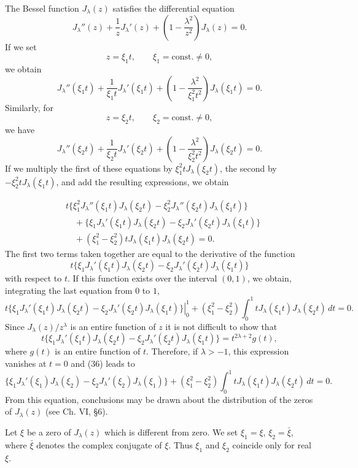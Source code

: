 The Bessel function $J_\lambda(z)$ satisfies the differential equation
\[
J_\lambda''(z)+\frac1zJ_\lambda'(z)+\left(1-\frac{\lambda^2}{z^2}\right)J_\lambda(z)=0.
\]
If we set
\[
z=\xi_1t,\qquad \xi_1=\text{const.}\ne0,
\]
we obtain
\[
J_\lambda''(\xi_1t)+\frac1{\xi_1t}J_\lambda'(\xi_1t)
+\left(1-\frac{\lambda^2}{\xi_1^2t^2}\right)J_\lambda(\xi_1t)=0.
\]
Similarly, for
\[
z=\xi_2t,\qquad \xi_2=\text{const.}\ne0,
\]
we have
\[
J_\lambda''(\xi_2t)+\frac1{\xi_2t}J_\lambda'(\xi_2t)
+\left(1-\frac{\lambda^2}{\xi_2^2t^2}\right)J_\lambda(\xi_2t)=0.
\]
If we multiply the first of these equations by $\xi_1^2tJ_\lambda(\xi_2t)$, the second by $-\xi_2^2tJ_\lambda(\xi_1t)$, and add the resulting expressions, we obtain

\[
\begin{aligned}
&t\{\xi_1^2J_\lambda''(\xi_1t)J_\lambda(\xi_2t)-\xi_2^2J_\lambda''(\xi_2t)J_\lambda(\xi_1t)\}\\
&\quad+\{\xi_1J_\lambda'(\xi_1t)J_\lambda(\xi_2t)-\xi_2J_\lambda'(\xi_2t)J_\lambda(\xi_1t)\}\\
&\quad+(\xi_1^2-\xi_2^2)tJ_\lambda(\xi_1t)J_\lambda(\xi_2t)=0.
\end{aligned}
\]
The first two terms taken together are equal to the derivative of the function
\[
t\{\xi_1J_\lambda'(\xi_1t)J_\lambda(\xi_2t)-\xi_2J_\lambda'(\xi_2t)J_\lambda(\xi_1t)\}
\]
with respect to $t$. If this function exists over the interval $(0,1)$, we obtain, integrating the last equation from $0$ to $1$,
\begin{equation}\tag{36}
\left.t\{\xi_1J_\lambda'(\xi_1t)J_\lambda(\xi_2t)-\xi_2J_\lambda'(\xi_2t)J_\lambda(\xi_1t)\}\right|_0^1
+(\xi_1^2-\xi_2^2)\int_0^1tJ_\lambda(\xi_1t)J_\lambda(\xi_2t)\,dt=0.
\end{equation}
Since $J_\lambda(z)/z^\lambda$ is an entire function of $z$ it is not difficult to show that
\[
t\{\xi_1J_\lambda'(\xi_1t)J_\lambda(\xi_2t)-\xi_2J_\lambda'(\xi_2t)J_\lambda(\xi_1t)\}=t^{2\lambda+2}g(t),
\]
where $g(t)$ is an entire function of $t$. Therefore, if $\lambda>-1$, this expression vanishes at $t=0$ and (36) leads to
\begin{equation}\tag{37}
\{\xi_1J_\lambda'(\xi_1)J_\lambda(\xi_2)-\xi_2J_\lambda'(\xi_2)J_\lambda(\xi_1)\}
+(\xi_1^2-\xi_2^2)\int_0^1tJ_\lambda(\xi_1t)J_\lambda(\xi_2t)\,dt=0.
\end{equation}
From this equation, conclusions may be drawn about the distribution of the zeros of $J_\lambda(z)$ (see Ch. VI, \S6).

Let $\xi$ be a zero of $J_\lambda(z)$ which is different from zero. We set $\xi_1=\xi$, $\xi_2=\bar\xi$, where $\bar\xi$ denotes the complex conjugate of $\xi$. Thus $\xi_1$ and $\xi_2$ coincide only for real $\xi$.

